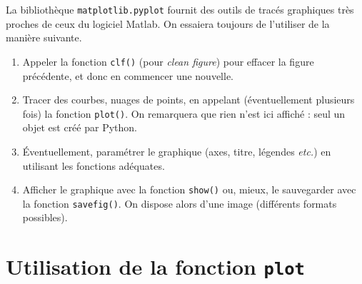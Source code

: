 La bibliothèque \texttt{matplotlib.pyplot} fournit des outils de tracés graphiques très proches de ceux du logiciel Matlab. 
On essaiera toujours de l'utiliser de la manière suivante. 
\begin{enumerate}
  \item Appeler la fonction \texttt{clf()} (pour \emph{clean figure}) pour effacer la figure précédente, et donc en commencer une nouvelle. 
  \item Tracer des courbes, nuages de points, en appelant (éventuellement plusieurs fois) la fonction \texttt{plot()}. On remarquera que rien n'est ici affiché : seul un objet est créé par Python. 
  \item Éventuellement, paramétrer le graphique (axes, titre, légendes \emph{etc.}) en utilisant les fonctions adéquates. 
  \item Afficher le graphique avec la fonction \texttt{show()} ou, mieux, le sauvegarder avec la fonction \texttt{savefig()}. On dispose alors d'une image (différents formats possibles). 
\end{enumerate}

\section{Utilisation de la fonction \texttt{plot}}

